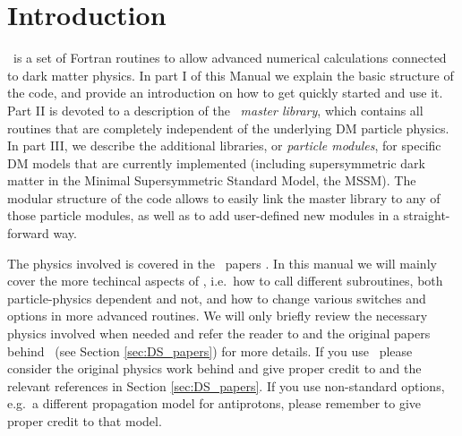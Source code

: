 \chapter{Introduction}

\ds\ is a set of Fortran routines to allow advanced numerical calculations
connected to dark matter physics. In part I of this Manual we explain the
basic structure of the code, and provide an introduction on how to get
quickly started and use it. Part II is devoted to a description of the 
\ds\ {\it master library}, which contains all routines that are completely independent
of the underlying DM particle physics.
In part III, we describe the additional libraries, or {\it particle modules}, for 
specific DM models that are currently implemented (including
supersymmetric dark matter in the Minimal Supersymmetric Standard
Model, the MSSM). The modular structure of the code allows to easily
link the master library to any of those particle modules, as well as to add
user-defined new modules in a straight-forward way.

The physics involved is covered in the \ds\ papers
\cite{ds4,ds6}. In this manual we will mainly cover the more techincal
aspects of \ds, i.e.~how to call different subroutines, both particle-physics 
dependent and not, and how to change various switches and options in more
advanced routines. We will only briefly review the necessary
physics involved when needed and refer the reader to \cite{ds4,ds6}
and the original papers behind \ds\ (see Section \ref{sec:DS_papers}) for more
details. If you use \ds\, please consider the original physics work
behind and give proper credit to \cite{ds6} and the relevant
references in Section \ref{sec:DS_papers}. If you use non-standard options,
e.g.\ a different propagation model for antiprotons, please remember
to give proper credit to that model.



